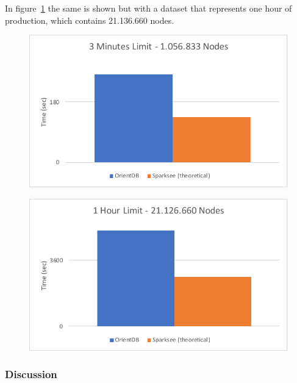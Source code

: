 In figure~\ref{fig:hourSuitability} the same is shown but with a dataset that represents one hour of production,
which contains 21.136.660 nodes.

\begin{figure}[h!]
  \begin{minipage}{.5\textwidth}
    \centering
    \includegraphics[width=\textwidth]{images/production/singleSuitability}
    \label{fig:singleSuitability}
  \end{minipage}
  \begin{minipage}{.5\textwidth}
    \centering
    \includegraphics[width=\textwidth]{images/production/hourSuitability}
    \label{fig:hourSuitability}
  \end{minipage}
\end{figure}

\subsubsection{Discussion}

